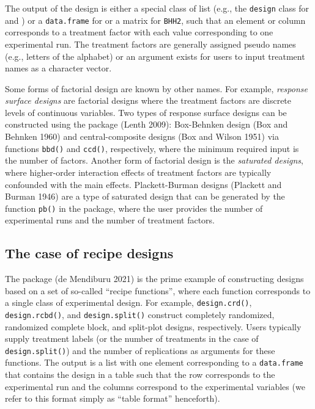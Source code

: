 The output of the design is either a special class of list (e.g., the \texttt{design} class for  and ) or a \texttt{data.frame} for  or a matrix for \texttt{BHH2}, such that an element or column corresponds to a treatment factor with each value corresponding to one experimental run. The treatment factors are generally assigned pseudo names (e.g., letters of the alphabet) or an argument exists for users to input treatment names as a character vector.

Some forms of factorial design are known by other names. For example, \emph{response surface designs} are factorial designs where the treatment factors are discrete levels of continuous variables. Two types of response surface designs can be constructed using the  package (Lenth 2009): Box-Behnken design (Box and Behnken 1960) and central-composite designs (Box and Wilson 1951) via functions \texttt{bbd()} and \texttt{ccd()}, respectively, where the minimum required input is the number of factors. Another form of factorial design is the \emph{saturated designs}, where higher-order interaction effects of treatment factors are typically confounded with the main effects. Plackett-Burman designs (Plackett and Burman 1946) are a type of saturated design that can be generated by the function \texttt{pb()} in the  package, where the user provides the number of experimental runs and the number of treatment factors.

\hypertarget{the-case-of-recipe-designs}{%
\subsection{The case of recipe designs}\label{the-case-of-recipe-designs}}

The  package (de Mendiburu 2021) is the prime example of constructing designs based on a set of so-called ``recipe functions'', where each function corresponds to a single class of experimental design. For example, \texttt{design.crd()}, \texttt{design.rcbd()}, and \texttt{design.split()} construct completely randomized, randomized complete block, and split-plot designs, respectively. Users typically supply treatment labels (or the number of treatments in the case of \texttt{design.split()}) and the number of replications as arguments for these functions. The output is a list with one element corresponding to a \texttt{data.frame} that contains the design in a table such that the row corresponds to the experimental run and the columns correspond to the experimental variables (we refer to this format simply as ``table format'' henceforth).

